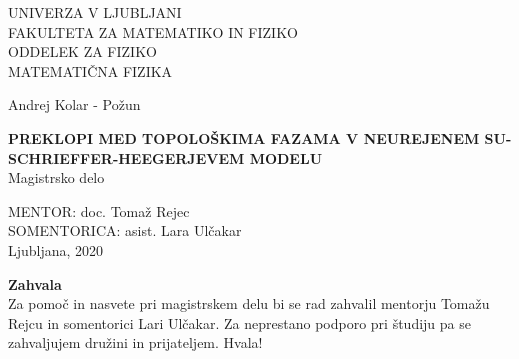 \pagestyle{empty}
\begin{center}

{\large UNIVERZA V LJUBLJANI\\
FAKULTETA ZA MATEMATIKO IN FIZIKO\\
ODDELEK ZA FIZIKO\\
MATEMATIČNA FIZIKA\\}


\vspace{4cm}


{\Large Andrej Kolar - Požun\\}

\vspace{10mm}

{\bf \Large PREKLOPI MED TOPOLOŠKIMA FAZAMA V NEUREJENEM SU-SCHRIEFFER-HEEGERJEVEM MODELU}\\
\vspace{5mm}
{\large Magistrsko delo}\\




\vfill



{\large MENTOR: doc. Tomaž Rejec\\
SOMENTORICA: asist. Lara Ulčakar\\


\vspace{2cm}
Ljubljana, 2020}

\end{center}


\cleardoublepage
\mbox{}
\vfill
{\Large \bf Zahvala}
\vspace{1cm}\\
Za pomoč in nasvete pri magistrskem delu bi se rad zahvalil mentorju Tomažu Rejcu in somentorici Lari Ulčakar.
Za neprestano podporo pri študiju pa se zahvaljujem družini in prijateljem. Hvala!

